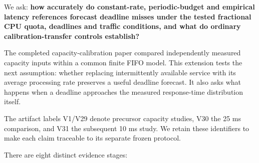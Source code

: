 \documentclass[11pt,a4paper]{article}
\begin{document}
We ask: \textbf{how accurately do constant-rate, periodic-budget and empirical latency references forecast deadline misses under the tested fractional CPU quota, deadlines and traffic conditions, and what do ordinary calibration-transfer controls establish?}

The completed capacity-calibration paper \cite{capacityprecursor} compared independently measured
capacity inputs within a common finite FIFO model. This extension tests the
next assumption: whether replacing intermittently available service with its
average processing rate preserves a useful deadline forecast. It also asks
what happens when a deadline approaches the measured response-time
distribution itself.

The artifact labels V1/V29 denote precursor capacity studies, V30 the 25 ms
comparison, and V31 the subsequent 10 ms study. We retain these identifiers
to make each claim traceable to its separate frozen protocol.

There are eight distinct evidence stages:
\end{document}
